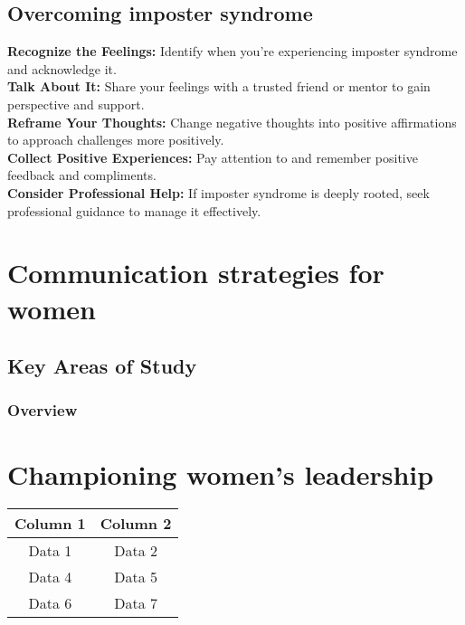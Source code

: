 \documentclass[12pt]{article}
\begin{document}
\subsection{Overcoming imposter syndrome}
\textbf{Recognize the Feelings:} Identify when you're experiencing imposter syndrome and acknowledge it.\\
\textbf{Talk About It:} Share your feelings with a trusted friend or mentor to gain perspective and support.\\
\textbf{Reframe Your Thoughts:} Change negative thoughts into positive affirmations to approach challenges more positively.\\
\textbf{Collect Positive Experiences:}  Pay attention to and remember positive feedback and compliments.\\
\textbf{Consider Professional Help:}  If imposter syndrome is deeply rooted, seek professional guidance to manage it effectively.\\

\section{ Communication strategies for women}
\subsection{Key Areas of Study}
\subsubsection{Overview}

\section{Championing women's leadership}





\begin{center}
\begin{tabular}{||c|c||}
\hline
\hline
\rowcolor[HTML]{89A8B2} Column 1 & Column 2 \\
\hline
\hline
\rowcolor[HTML]{F8FAFC} Data 1 & Data 2 \\ %
\hline

\rowcolor[HTML]{D8EFD3} Data 4 & Data 5 \\
\hline

\rowcolor[HTML]{F8FAFC} Data 6 & Data 7 \\ %
\hline
\hline
\end{tabular}
\end{center}
\bigskip %

\subsubsection{}
\end{document}
